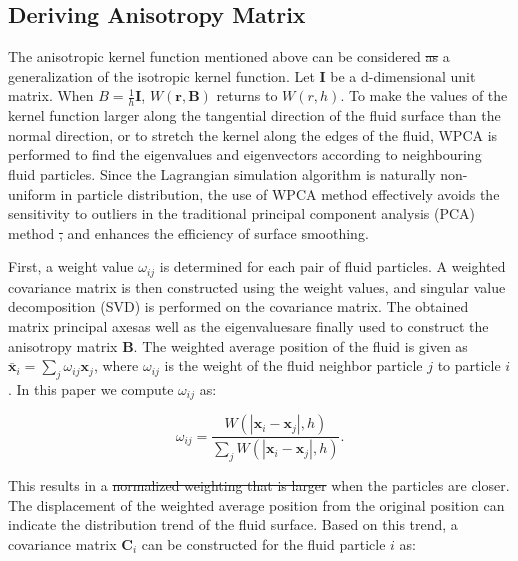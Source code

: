 \documentclass[times,twocolumn,final]{elsarticle}
\providecommand{\DIFaddtex}[1]{{\protect\color{blue}\uwave{#1}}} %
\providecommand{\DIFdeltex}[1]{{\protect\color{red}\sout{#1}}}                      %
\providecommand{\DIFaddbegin}{} %
\providecommand{\DIFaddend}{} %
\providecommand{\DIFdelbegin}{} %
\providecommand{\DIFdelend}{} %
\providecommand{\DIFadd}[1]{\texorpdfstring{\DIFaddtex{#1}}{#1}} %
\providecommand{\DIFdel}[1]{\texorpdfstring{\DIFdeltex{#1}}{}} %
\begin{document}
\DIFaddend \subsection{Deriving Anisotropy Matrix}
The anisotropic kernel function mentioned above can be considered \DIFdelbegin \DIFdel{as }\DIFdelend a generalization of the isotropic kernel function. Let $\mathbf{I}$ be a d-dimensional unit matrix. When $B=\frac 1 h \mathbf{I}$, $W(\mathbf{r},\mathbf{B})$ returns to $W(r,h)$. To make the values of the kernel function larger along the tangential direction of the fluid surface than the normal direction, or to stretch the kernel along the edges of the fluid, WPCA\cite{ref:ref30} is performed to find the eigenvalues and eigenvectors according to neighbouring fluid particles. Since the Lagrangian simulation algorithm is naturally non-uniform in particle distribution, the use of \DIFaddbegin \DIFadd{the }\DIFaddend WPCA method effectively avoids the sensitivity to outliers in the traditional principal component analysis (PCA) method \DIFdelbegin \DIFdel{, }\DIFdelend and enhances the efficiency of surface smoothing.

First, a weight value $\omega_{ij}$ is determined for each pair of fluid particles. A weighted covariance matrix is then constructed using the weight values, and singular value decomposition (SVD) is performed on the covariance matrix. The obtained matrix principal axes\DIFaddbegin \DIFadd{, }\DIFaddend as well as the eigenvalues\DIFaddbegin \DIFadd{, }\DIFaddend are finally used to construct the anisotropy matrix $\mathbf{B}$. The weighted average position of the fluid is given as $\bar{\mathbf{x}}_{i}=\sum_{j} \omega_{ij} \mathbf{x}_{j}$, where $\omega_{ij}$ is the weight of the fluid neighbor particle $j$ to particle $i$. In this paper we 
compute $\omega_{i j}$ as:

\begin{equation}
\omega_{i j}=\frac{W\left(\left|\mathbf{x}_{i}-\mathbf{x}_{j}\right|, h\right)}{\sum_{j} W\left(\left|\mathbf{x}_{i}-\mathbf{x}_{j}\right|, h\right)}.\label{con:equa11}
\end{equation}

This results in a \DIFdelbegin \DIFdel{normalized weighting that is larger }\DIFdelend \DIFaddbegin \DIFadd{larger normalised weighting }\DIFaddend when the particles are closer. The displacement of the weighted average position from the original position can indicate the distribution trend of the fluid surface. Based on this trend, a covariance matrix $\mathbf{C}_i$ can be constructed for the fluid particle $i$ as:
\end{document}

